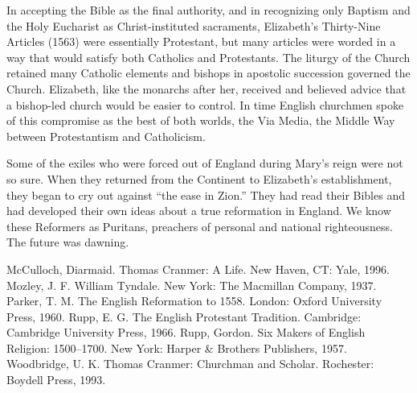 In accepting the Bible as the final authority, and in recognizing only Baptism and the Holy
Eucharist as Christ-instituted sacraments, Elizabeth’s Thirty-Nine Articles (1563) were essentially
Protestant, but many articles were worded in a way that would satisfy both Catholics and
Protestants. The liturgy of the Church retained many Catholic elements and bishops in apostolic
succession governed the Church. Elizabeth, like the monarchs after her, received and believed advice
that a bishop-led church would be easier to control. In time English churchmen spoke of this
compromise as the best of both worlds, the Via Media, the Middle Way between Protestantism and
Catholicism.

Some of the exiles who were forced out of England during Mary’s reign were not so sure. When they
returned from the Continent to Elizabeth’s establishment, they began to cry out against “the ease in
Zion.” They had read their Bibles and had developed their own ideas about a true reformation in
England. We know these Reformers as Puritans, preachers of personal and national righteousness. The
future was dawning.

\begin{readinglist}
\entry *McCulloch, Diarmaid. Thomas Cranmer: A Life. New Haven, CT: Yale, 1996.
\entry Mozley, J. F. William Tyndale. New York: The Macmillan Company, 1937.
\entry Parker, T. M. The English Reformation to 1558. London: Oxford University Press, 1960.
\entry Rupp, E. G. The English Protestant Tradition. Cambridge: Cambridge University Press, 1966.
\entry Rupp, Gordon. Six Makers of English Religion: 1500–1700. New York: Harper \& Brothers
  Publishers, 1957.
\entry Woodbridge, U. K. Thomas Cranmer: Churchman and Scholar. Rochester: Boydell Press, 1993.
\end{readinglist}
